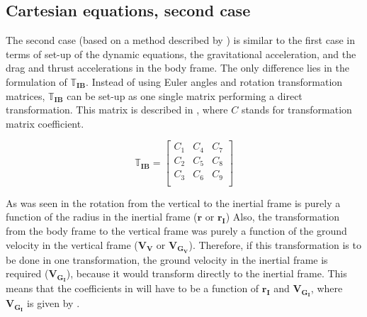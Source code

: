  
\subsection{Cartesian equations, second case}
\label{subsec:careq2}
The second case (based on a method described by \citep{bergsma2015application}) is similar to the first case in terms of set-up of the dynamic equations, the gravitational acceleration, and the drag and thrust accelerations in the body frame. The only difference lies in the formulation of $\mathbb{T}_{\mathbf{IB}}$. Instead of using Euler angles and rotation transformation matrices, $\mathbb{T}_{\mathbf{IB}}$ can be set-up as one single matrix performing a direct transformation. This matrix is described in , where $C$ stands for transformation matrix coefficient. 

\begin{equation} \label{eq:transMatCoef}
\mathbb{T}_{\mathbf{IB}} = 
\left[
\begin{matrix}
C_{1} & C_{4} & C_{7} \\
C_{2} & C_{5} & C_{8} \\
C_{3} & C_{6} & C_{9} \\
\end{matrix}
\right]
\end{equation}

As was seen in  the rotation from the vertical to the inertial frame is purely a function of the radius in the inertial frame ($\mathbf{r}$ or $\mathbf{r_{I}}$) Also, the transformation from the body frame to the vertical frame was purely a function of the ground velocity in the vertical frame ($\mathbf{V_{V}}$ or $\mathbf{V_{G_{V}}}$). Therefore, if this transformation is to be done in one transformation, the ground velocity in the inertial frame is required ($\mathbf{V_{G_{I}}}$), because it would transform directly to the inertial frame. This means that the coefficients in  will have to be a function of $\mathbf{r_{I}}$ and $\mathbf{V_{G_{I}}}$, where $\mathbf{V_{G_{I}}}$ is given by .

